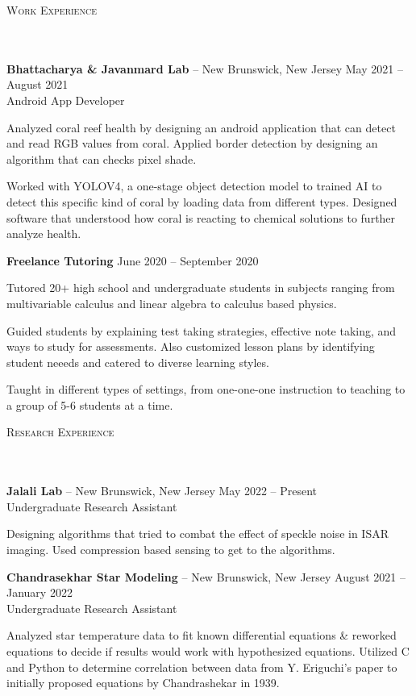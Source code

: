 \documentclass{article}
\newcommand{\header}[1]{{
\hspace*{0pt}\vspace*{6pt} \textsc{#1}} \vspace*{-6pt} 
\lineunder
}
\newcommand{\lineunder}{
\vspace*{-8pt} \\ \hspace*{-3pt} 
\hrulefill \\
}
\newcommand{\employer}[4]{{
\vspace*{2pt}%
\textbf{#1} #2 \hfill #3\\ #4 \vspace*{2pt}}
}
\renewcommand{\labelitemii}{
$\vcenter{\hbox{\tiny$\bullet$}}$\hspace*{-3pt}
}
\newenvironment{bullet-list-minor}{
\begin{list}{\labelitemii}{\setlength\leftmargin{15pt} 
\topsep 0pt \itemsep -2pt}}{\vspace*{4pt}\end{list}
}
\begin{document}
\vspace*{4pt}%
\header{Work Experience}
    \employer{Bhattacharya \& Javanmard Lab}
    {-- New Brunswick, New Jersey}{May 2021 -- August 2021}{Android App Developer}
	\begin{bullet-list-minor}
	\item Analyzed coral reef health by designing an android application that can detect and read RGB values from coral. Applied border detection by designing an algorithm that can checks pixel shade.
	\item Worked with YOLOV4, a one-stage object detection model to trained AI to detect this specific kind of coral by loading data from different types. Designed software that understood how coral is reacting to chemical solutions to further analyze health.
    \end{bullet-list-minor}
    
    \employer{Freelance Tutoring}
    {}{June 2020 -- September 2020}{}
	\begin{bullet-list-minor}
	\item Tutored 20+ high school and undergraduate students in subjects ranging from multivariable calculus and linear algebra to calculus based physics. 
	\item Guided students by explaining test taking strategies, effective note taking, and ways to study for assessments. Also customized lesson plans by identifying student neeeds and catered to diverse learning styles. 
	\item Taught in different types of settings, from one-one-one instruction to teaching to a group of 5-6 students at a time.
	\end{bullet-list-minor}

\vspace*{4pt}%
\header{Research Experience}
    \employer{Jalali Lab}
    {-- New Brunswick, New Jersey }{May 2022 -- Present}{Undergraduate Research Assistant}
    \begin{bullet-list-minor}
	\item Designing algorithms that tried to combat the effect of speckle noise in ISAR imaging. Used compression based sensing to get to the algorithms.
    \end{bullet-list-minor}

    \employer{Chandrasekhar Star Modeling}
    {-- New Brunswick, New Jersey}{August 2021 -- January 2022}{Undergraduate Research Assistant}
	\begin{bullet-list-minor}
	\item Analyzed star temperature data to fit known differential equations \& reworked equations to decide if results would
    work with hypothesized equations. Utilized C and Python to determine correlation between data from Y. Eriguchi’s paper to initially proposed
    equations by Chandrashekar in 1939.
    \end{bullet-list-minor}
\end{document}
